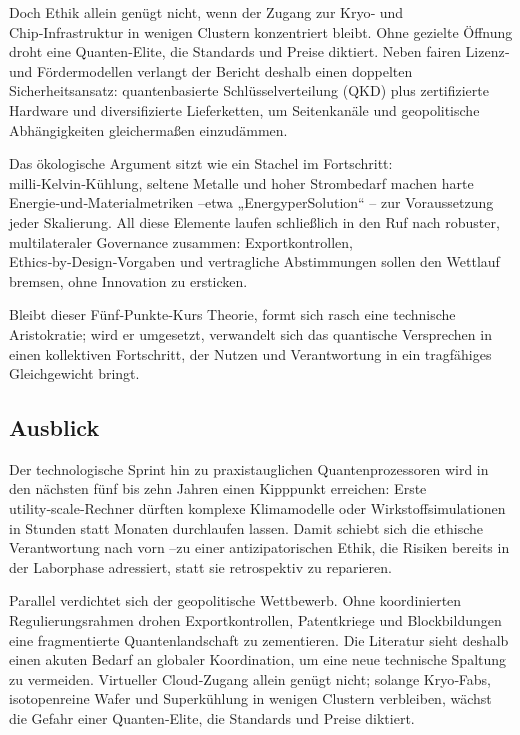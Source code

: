 Doch Ethik allein genügt nicht, wenn der Zugang zur Kryo‑ und Chip‑Infrastruktur in wenigen Clustern konzentriert bleibt. Ohne gezielte Öffnung droht eine Quanten‑Elite, die Standards und Preise diktiert. Neben fairen Lizenz‑ und Fördermodellen verlangt der Bericht deshalb einen doppelten Sicherheitsansatz: quantenbasierte Schlüsselverteilung (QKD) plus zertifizierte Hardware und diversifizierte Lieferketten, um Seitenkanäle und geopolitische Abhängigkeiten gleichermaßen einzudämmen.

Das ökologische Argument sitzt wie ein Stachel im Fortschritt: milli‑Kelvin‑Kühlung, seltene Metalle und hoher Strombedarf machen harte Energie‑und‑Materialmetriken –etwa „EnergyperSolution“ – zur Voraussetzung jeder Skalierung. All diese Elemente laufen schließlich in den Ruf nach robuster, multilateraler Governance zusammen: Exportkontrollen, Ethics‑by‑Design‑Vorgaben und vertragliche Abstimmungen sollen den Wettlauf bremsen, ohne Innovation zu ersticken.

Bleibt dieser Fünf‑Punkte‑Kurs Theorie, formt sich rasch eine technische Aristokratie; wird er umgesetzt, verwandelt sich das quantische Versprechen in einen kollektiven Fortschritt, der Nutzen und Verantwortung in ein tragfähiges Gleichgewicht bringt.

\cite{noauthor}



\subsection{Ausblick}


Der technologische Sprint hin zu praxistauglichen Quantenprozessoren wird in den nächsten fünf bis zehn Jahren einen Kipppunkt erreichen: Erste utility‑scale‑Rechner dürften komplexe Klimamodelle oder Wirkstoffsimulationen in Stunden statt Monaten durchlaufen lassen. Damit schiebt sich die ethische Verantwortung nach vorn –zu einer antizipatorischen Ethik, die Risiken bereits in der Laborphase adressiert, statt sie retrospektiv zu reparieren.

Parallel verdichtet sich der geopolitische Wettbewerb. Ohne koordinierten Regulierungsrahmen drohen Exportkontrollen, Patentkriege und Blockbildungen eine fragmentierte Quantenlandschaft zu zementieren. Die Literatur sieht deshalb einen akuten Bedarf an globaler Koordination, um eine neue technische Spaltung zu vermeiden. Virtueller Cloud‑Zugang allein genügt nicht; solange Kryo‑Fabs, isotopenreine Wafer und Superkühlung in wenigen Clustern verbleiben, wächst die Gefahr einer Quanten‑Elite, die Standards und Preise diktiert.

